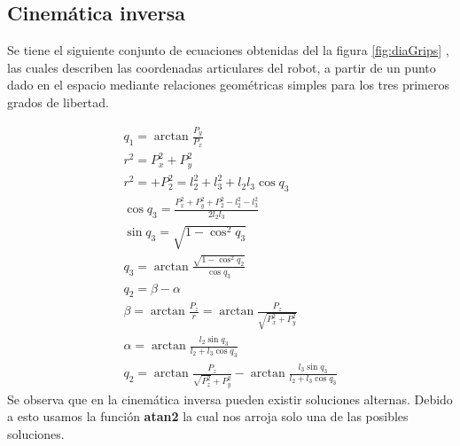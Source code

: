%
%
%
%
%    
%
%
%
%
%


\subsection{Cinemática inversa}
Se tiene el siguiente conjunto de ecuaciones obtenidas del la figura \ref{fig:diaGrips} , las cuales describen las coordenadas articulares del robot, a partir de un punto dado en el espacio mediante relaciones geométricas simples para los tres primeros grados de libertad.

\begin{eqnarray}
 q_1=\arctan{\frac{P_y}{P_x}} \\ 
 r^{2}=P_x^{2}+P_y^{2}\\ 
 r^{2}=+P_2^{2}=l_2^{2}+l_3^{2}+l_2l_3\cos{q_3}\\ 
 \cos{q_3}=\frac{P_x^{2}+P_y^{2}+P_2^{2}-l_2^{2}-l_3^{2}}{2l_2l_3}\\ 
 \sin{q_3}=\sqrt{1-\cos^{2}{q_3}}\\ 
 q_3=\arctan{\frac{\sqrt{1-\cos^{2}{q_2}}}{\cos{q_3}}}\\ 
 q_2=\beta -\alpha\\ 
 \beta=\arctan{\frac{P_z}{r}}=\arctan{\frac{P_z}{\sqrt{P_x^{2}+P_y^{2}}}}\\ 
 \alpha=\arctan{\frac{l_2\sin{q_3}}{l_2+l_3 \cos{q_3}}}\\ 
 q_2=\arctan{\frac{P_z}{\sqrt{P_z^{2}}+P_y^{2}}}-\arctan{\frac{l_3\sin{q_3}}{l_2+l_3\cos{q_3}}}
\end{eqnarray}
Se observa que en la cinemática inversa pueden existir soluciones alternas. Debido a esto usamos la función \textbf{atan2} la cual nos arroja solo una de las posibles soluciones.\\
 
